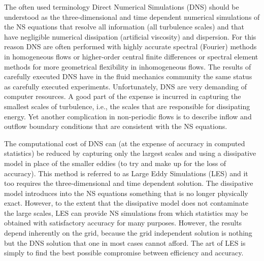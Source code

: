 

The often used terminology Direct Numerical Simulations (DNS) should be understood as the three-dimensional and time dependent numerical simulations of the NS equations that resolve all information (all turbulence scales) and that have negligible numerical dissipation (artificial viscosity) and dispersion. For this reason DNS are often performed with highly accurate spectral (Fourier) methods \cite{Canuto88} in homogeneous flows or higher-order central finite differences or spectral element methods \cite{Semtex} for more geometrical flexibility in inhomogeneous flows. The results of carefully executed DNS have in the fluid mechanics community the same status as carefully executed experiments. Unfortunately, DNS are very demanding of computer resources. A good part of the expense is incurred in capturing the smallest scales of turbulence, i.e., the scales that are responsible for dissipating energy. Yet another complication in non-periodic flows is to describe inflow and outflow boundary conditions that are consistent with the NS equations.

The computational cost of DNS can (at the expense of accuracy in computed statistics) be reduced by capturing only the largest scales and using a dissipative model in place of the smaller eddies (to try and make up for the loss of accuracy). This method is referred to as Large Eddy Simulations (LES) and it too requires the three-dimensional and time dependent solution. The dissipative model introduces into the NS equations something that is no longer physically exact. However, to the extent that the dissipative model does not contaminate the large scales, LES can provide NS simulations from which statistics may be obtained with satisfactory accuracy for many purposes. However, the results depend inherently on the grid, because the grid independent solution is nothing but the DNS solution that one in most cases cannot afford. The art of LES is simply to find the best possible compromise between efficiency and accuracy.

